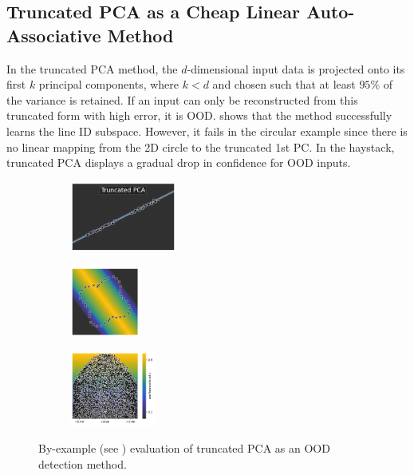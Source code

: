 \subsection{Truncated PCA as a Cheap Linear Auto-Associative Method} \label{txt:truncated-pca}

In the truncated PCA method, the $d$-dimensional input data is projected onto its first $k$ principal components, where $k < d$ and chosen such that at least $95\%$ of the variance is retained. If an input can only be reconstructed from this truncated form with high error, it is OOD.  shows that the method successfully learns the line ID subspace. However, it fails in the circular example since there is no linear mapping from the 2D circle to the truncated 1st PC. In the haystack, truncated PCA displays a gradual drop in confidence for OOD inputs.

\begin{figure}[H]
    \centering
    \begin{subfigure}
        \centering
        \includegraphics[width=0.388\textwidth,valign=t]{ood-detection/figures/ood-detection/confidence-line-truncated-pca.pdf}
    \end{subfigure}
    \begin{subfigure}
        \centering
        \includegraphics[width=0.254\textwidth,valign=t]{ood-detection/figures/ood-detection/confidence-circle-truncated-pca.pdf}
    \end{subfigure}
    \begin{subfigure}
        \centering
        \includegraphics[width=0.308\textwidth,valign=t]{ood-detection/figures/ood-detection/confidence-haystack-truncated-pca.pdf}
    \end{subfigure}

    \caption[Truncated PCA as an OOD detection method]{By-example (see ) evaluation of truncated PCA as an OOD detection method.}
    \label{fig:truncated-pca-ood-detection}
\end{figure}

